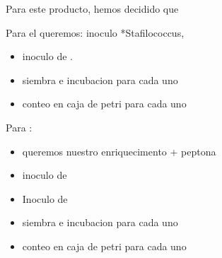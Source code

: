 \documentclass[letterpaper,10pt,spanish]{sphinxmanual}
\begin{document}
\begin{sphinxVerbatim}[commandchars=\\\{\}]
                                                  
                                                
                                                
                                                      
\end{sphinxVerbatim}

Para este producto, hemos decidido que

Para el  queremos: \sphinxhyphen{} inoculo *Stafilococcus,
\begin{itemize}
\item {} 
inoculo de .

\item {} 
siembra e incubacion para cada uno

\item {} 
conteo en caja de petri para cada uno

\end{itemize}

Para :
\begin{itemize}
\item {} 
queremos nuestro enriquecimento + peptona

\item {} 
inoculo de 

\item {} 
Inoculo de 

\item {} 
siembra e incubacion para cada uno

\item {} 
conteo en caja de petri para cada uno

\end{itemize}
\end{document}
